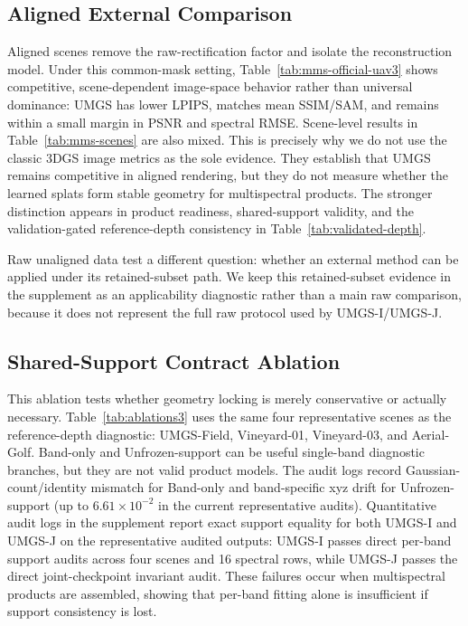 \subsection{Aligned External Comparison}

Aligned scenes remove the raw-rectification factor and isolate the reconstruction model. Under this common-mask setting, Table~\ref{tab:mms-official-uav3} shows competitive, scene-dependent image-space behavior rather than universal dominance: UMGS has lower LPIPS, matches mean SSIM/SAM, and remains within a small margin in PSNR and spectral RMSE. Scene-level results in Table~\ref{tab:mms-scenes} are also mixed. This is precisely why we do not use the classic 3DGS image metrics as the sole evidence. They establish that UMGS remains competitive in aligned rendering, but they do not measure whether the learned splats form stable geometry for multispectral products. The stronger distinction appears in product readiness, shared-support validity, and the validation-gated reference-depth consistency in Table~\ref{tab:validated-depth}.




Raw unaligned data test a different question: whether an external method can be applied under its retained-subset path. We keep this retained-subset evidence in the supplement as an applicability diagnostic rather than a main raw comparison, because it does not represent the full raw protocol used by UMGS-I/UMGS-J.

\subsection{Shared-Support Contract Ablation}

This ablation tests whether geometry locking is merely conservative or actually necessary. Table~\ref{tab:ablations3} uses the same four representative scenes as the reference-depth diagnostic: UMGS-Field, Vineyard-01, Vineyard-03, and Aerial-Golf. Band-only and Unfrozen-support can be useful single-band diagnostic branches, but they are not valid product models. The audit logs record Gaussian-count/identity mismatch for Band-only and band-specific xyz drift for Unfrozen-support (up to $6.61\times10^{-2}$ in the current representative audits). Quantitative audit logs in the supplement report exact support equality for both UMGS-I and UMGS-J on the representative audited outputs: UMGS-I passes direct per-band support audits across four scenes and 16 spectral rows, while UMGS-J passes the direct joint-checkpoint invariant audit. These failures occur when multispectral products are assembled, showing that per-band fitting alone is insufficient if support consistency is lost.

